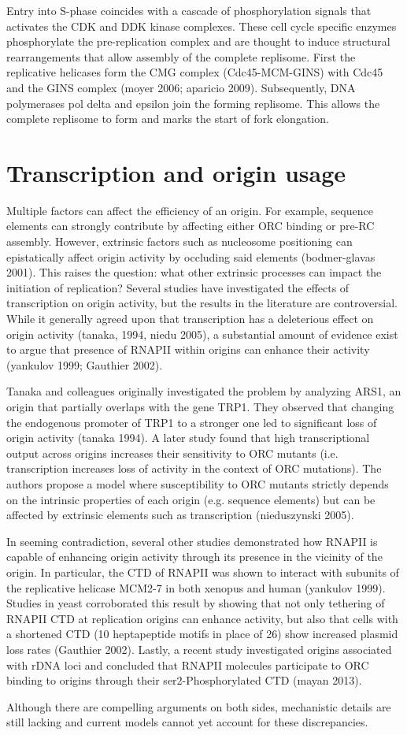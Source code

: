 Entry into S-phase coincides with a cascade of phosphorylation signals that activates the CDK and DDK kinase complexes. These cell cycle specific enzymes phosphorylate the pre-replication complex and are thought to induce structural rearrangements that allow assembly of the complete replisome. First the replicative helicases form the CMG complex (Cdc45-MCM-GINS) with Cdc45 and the GINS complex (moyer 2006; aparicio 2009). Subsequently, DNA polymerases pol delta and epsilon join the forming replisome. This allows the complete replisome to form and marks the start of fork elongation.

\section{Transcription and origin usage}

Multiple factors can affect the efficiency of an origin.  For example, sequence elements can strongly contribute by affecting either ORC binding or pre-RC assembly. However, extrinsic factors such as nucleosome positioning can epistatically affect origin activity by occluding said elements (bodmer-glavas 2001). This raises the question: what other extrinsic processes can impact the initiation of replication? Several studies have investigated the effects of transcription on origin activity, but the results in the literature are controversial. While it generally agreed upon that transcription has a deleterious effect on origin activity (tanaka, 1994, niedu 2005), a substantial amount of evidence exist to argue that presence of RNAPII within origins can enhance their activity (yankulov 1999; Gauthier 2002). 

Tanaka and colleagues originally investigated the problem by analyzing ARS1, an origin that partially overlaps with the gene TRP1. They observed that changing the endogenous promoter of TRP1 to a stronger one led to significant loss of origin activity (tanaka 1994). A later study found that high transcriptional output across origins increases their sensitivity to ORC mutants (i.e. transcription increases loss of activity in the context of ORC mutations). The authors propose a model where susceptibility to ORC mutants strictly depends on the intrinsic properties of each origin (e.g. sequence elements) but can be affected by extrinsic elements such as transcription (nieduszynski 2005). 

In seeming contradiction, several other studies demonstrated how RNAPII is capable of enhancing origin activity through its presence in the vicinity of the origin. In particular, the CTD of RNAPII was shown to interact with subunits of the replicative helicase MCM2-7 in both xenopus and human (yankulov 1999). Studies in yeast corroborated this result by showing that not only tethering of RNAPII CTD at replication origins can enhance activity, but also that cells with a shortened CTD (10 heptapeptide motifs in place of 26) show increased plasmid loss rates (Gauthier 2002). Lastly, a recent study investigated origins associated with rDNA loci and concluded that RNAPII molecules participate to ORC binding to origins through their  ser2-Phosphorylated CTD (mayan 2013). 

Although there are compelling arguments on both sides, mechanistic details are still lacking and current models cannot yet account for these discrepancies.










